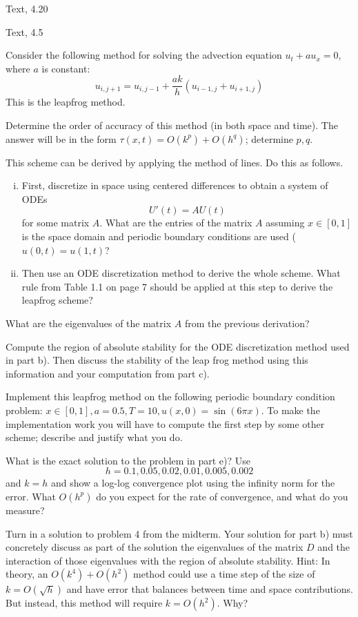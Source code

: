 \documentclass[minion]{homework}
\begin{document}
\begin{problems}

\problem  Text, 4.20

\problem Text, 4.5

\problem  Consider the following method for solving the advection equation 
$u_t + au_x = 0$, where $a$ is constant:
\[
u_{i,j+1} = u_{i,j-1} + \frac{ak}{h}(u_{i-1,j}+u_{i+1,j})
\]
This is the leapfrog method.

\begin{subproblems}
\item Determine the order of accuracy of this method (in both space and time). The answer will be in the form $\tau(x,t)= O(k^p) +O(h^q)$; determine $p,q$.

\item This scheme can be derived by applying the method of lines.  
Do this as follows.
\begin{enumerate}[i)] 
	\item First, discretize in space using centered differences
to obtain a system of ODEs
\[
U'(t) = A U(t)
\]
for some matrix $A$.  What are the entries of the matrix $A$
assuming $x\in[0,1]$ is the space domain and periodic
boundary conditions are used ($u(0,t)=u(1,t)$?
\item Then use an ODE discretization method to derive the
whole scheme.  What rule from Table 1.1 on page 7 should be
applied at this step to derive the leapfrog scheme?
\end{enumerate}
\item What are the eigenvalues of the matrix $A$ from the previous derivation? 

\item Compute the region of absolute stability for the ODE discretization
method used in part b).  Then discuss the stability of the leap frog method
using this information and your computation from part c).

\item Implement this leapfrog method on the following periodic boundary condition problem: $x \in [0, 1], a = 0.5, T = 10, u(x, 0) = \sin(6\pi x)$. 
To make the implementation work you will have to compute the first step by some other scheme; describe and justify what you do.

\item What is the exact solution to the problem in part e)? Use
\[
h = 0.1, 0.05, 0.02, 0.01, 0.005, 0.002
\]
and $k = h$ and show a log-log convergence plot using the infinity norm for the error. What $O(h^p)$ do you expect for the rate of convergence, and what do you measure?
\end{subproblems}

\problem Turn in a solution to problem 4 from the midterm. Your solution for part b) must concretely discuss as part of the solution the eigenvalues of the matrix $D$ and the interaction of those eigenvalues with the region of absolute stability.  Hint: In theory, an $O(k^4)+O(h^2)$ method could use a time step of the size of $k=O(\sqrt{h})$ and have error that balances between time and space contributions.  But instead, this method will require $k=O(h^2)$.  Why?

\end{problems}
\end{document}
